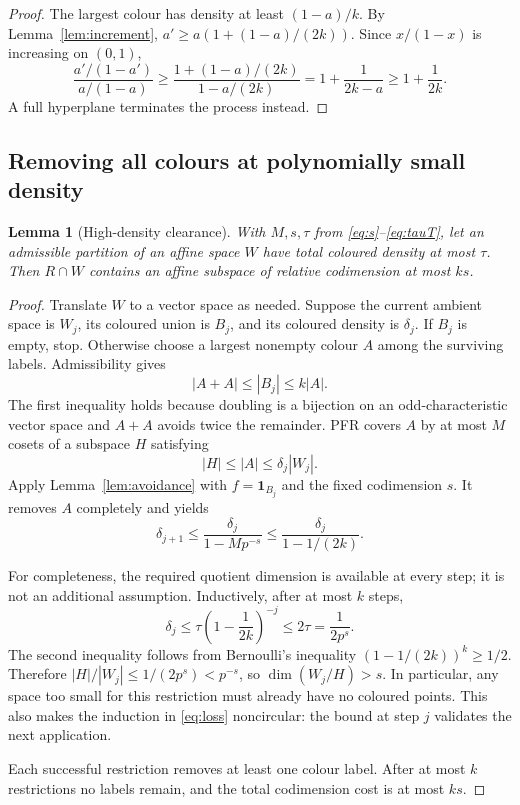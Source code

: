 \documentclass[11pt]{article}
\newtheorem{lemma}[theorem]{Lemma}
\theoremstyle{remark}
\newcommand{\ind}{\mathbf 1}
\begin{document}
\begin{proof}
The largest colour has density at least $(1-a)/k$. By
Lemma~\ref{lem:increment},
$a'\geq a(1+(1-a)/(2k))$. Since $x/(1-x)$ is increasing on $(0,1)$,
\[
 \frac{a'/(1-a')}{a/(1-a)}
 \geq\frac{1+(1-a)/(2k)}{1-a/(2k)}
 =1+\frac1{2k-a}\geq1+\frac1{2k}.
\]
A full hyperplane terminates the process instead.
\end{proof}

\subsection{Removing all colours at polynomially small density}

\begin{lemma}[High-density clearance]\label{lem:clearance}
With $M,s,\tau$ from \eqref{eq:s}--\eqref{eq:tauT}, let an admissible
partition of an affine space $W$ have total coloured density at most
$\tau$. Then $R\cap W$ contains an affine subspace of relative codimension
at most $ks$.
\end{lemma}

\begin{proof}
Translate $W$ to a vector space as needed. Suppose the current ambient
space is $W_j$, its coloured union is $B_j$, and its coloured density is
$\delta_j$. If $B_j$ is empty, stop. Otherwise choose a largest nonempty
colour $A$ among the surviving labels. Admissibility gives
\[
 |A+A|\leq |B_j|\leq k|A|.
\]
The first inequality holds because doubling is a bijection on an
odd-characteristic vector space and $A+A$ avoids twice the remainder.
PFR covers $A$ by at most $M$ cosets of a subspace $H$ satisfying
\[
 |H|\leq|A|\leq\delta_j|W_j|.
\]
Apply Lemma~\ref{lem:avoidance} with $f=\ind_{B_j}$ and the fixed
codimension $s$. It removes $A$ completely and yields
\begin{equation}\label{eq:loss}
 \delta_{j+1}\leq\frac{\delta_j}{1-Mp^{-s}}
 \leq\frac{\delta_j}{1-1/(2k)}.
\end{equation}

For completeness, the required quotient dimension is available at every
step; it is not an additional assumption. Inductively, after at most $k$
steps,
\[
 \delta_j\leq\tau\left(1-\frac1{2k}\right)^{-j}\leq2\tau
 =\frac1{2p^s}.
\]
The second inequality follows from Bernoulli's inequality
$(1-1/(2k))^k\geq1/2$. Therefore
$|H|/|W_j|\leq1/(2p^s)<p^{-s}$, so $\dim(W_j/H)>s$.
In particular, any space too small for this restriction must already have
no coloured points. This also makes the induction in \eqref{eq:loss}
noncircular: the bound at step $j$ validates the next application.

Each successful restriction removes at least one colour label. After at
most $k$ restrictions no labels remain, and the total codimension cost is
at most $ks$.
\end{proof}
\end{document}
